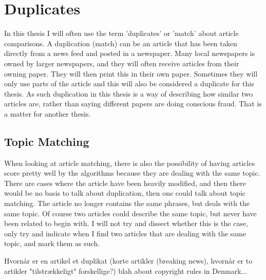 \section{Duplicates}
In this thesis I will often use the term 'duplicates' or 'match' about article comparisons. A duplication (match) can be an article that has been taken directly from a news feed and posted in a newspaper. Many local newspapers is owned by larger newspapers, and they will often receive articles from their owning paper. They will then print this in their own paper. Sometimes they will only use parts of the article and this will also be considered a duplicate for this thesis. As such duplication in this thesis is a way of describing how similar two articles are, rather than saying different papers are doing conscious fraud. That is a matter for another thesis.

\subsection{Topic Matching}
When looking at article matching, there is also the possibility of having articles score pretty well by the algorithms because they are dealing with the same topic. There are cases where the article have been heavily modified, and then there would be no basis to talk about duplication, then one could talk about topic matching. The article no longer contains the same phrases, but deals with the same topic.
Of course two articles could describe the same topic, but never have been related to begin with. I will not try and dissect whether this is the case, only try and indicate when I find two articles that are dealing with the same topic, and mark them as such. 

Hvornår er en artikel et duplikat (korte artikler (breaking news), hvornår er to artikler "tilstrækkeligt" forskellige?)
blah about copyright rules in Denmark...